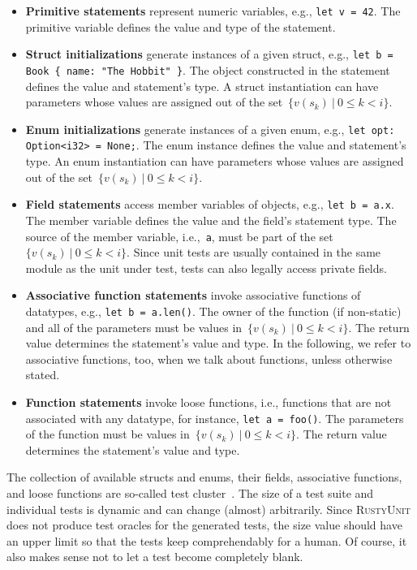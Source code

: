 \documentclass[paper=a4,%
  twoside,%
  BCOR4mm,%
  abstract=true,%
  toc=bibliography,%
  chapterprefix=true,%
  toc=bibliographynumbered,%
  open=right,%
  english,%
  pagesize=pdftex]{scrreprt}
\newcommand{\tech}{\textsc{RustyUnit}\xspace}
\begin{document}
\begin{itemize}
    \item \textbf{Primitive statements} represent numeric variables, e.g., \texttt{let v = 42}. The primitive variable defines the value and type of the statement.
    \item \textbf{Struct initializations} generate instances of a given struct, e.g., \texttt{let b = Book \{ name: "The Hobbit" \}}. The object constructed in the statement defines the value and statement's type. A struct instantiation can have parameters whose values are assigned out of the set~$\{v(s_k)~|~0 \leq k < i\}$.
    \item \textbf{Enum initializations} generate instances of a given enum, e.g., \texttt{let opt: Option<i32> = None;}. The enum instance defines the value and statement's type. An enum instantiation can have parameters whose values are assigned out of the set~$\{v(s_k)~|~0 \leq k < i\}$.
    \item \textbf{Field statements} access member variables of objects, e.g., \texttt{let b = a.x}. The member variable defines the value and the field's statement type. The source of the member variable, i.e.,~\texttt{a}, must be part of the set~$\{v(s_k)~|~0 \leq k < i\}$. Since unit tests are usually contained in the same module as the unit under test, tests can also legally access private fields.
    \item \textbf{Associative function statements} invoke associative functions of datatypes, e.g., \texttt{let b = a.len()}. The owner of the function (if non-static) and all of the parameters must be values in~${\{v(s_k)~|~0 \leq k < i\}}$. The return value determines the statement's value and type. In the following, we refer to associative functions, too, when we talk about functions, unless otherwise stated.
    \item \textbf{Function statements} invoke loose functions, i.e., functions that are not associated with any datatype, for instance, \texttt{let a = foo()}. The parameters of the function must be values in~$\{v(s_k)~|~0 \leq k < i\}$. The return value determines the statement's value and type.
\end{itemize}

The collection of available structs and enums, their fields, associative functions, and loose functions are so-called test cluster~\cite{Fraser_2011a}. The size of a test suite and individual tests is dynamic and can change (almost) arbitrarily. Since \tech does not produce test oracles for the generated tests, the size value should have an upper limit so that the tests keep comprehendably for a human. Of course, it also makes sense not to let a test become completely blank.
\end{document}
